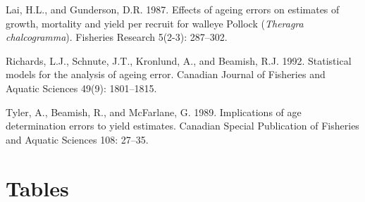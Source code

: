 \documentclass[11pt]{book}
\begin{document}
\leavevmode\hypertarget{ref-lai1987effects}{}%
Lai, H.L., and Gunderson, D.R. 1987. Effects of ageing errors on estimates of growth, mortality and yield per recruit for walleye Pollock (\emph{Theragra chalcogramma}). Fisheries Research 5(2-3): 287--302.

\leavevmode\hypertarget{ref-richards1992statistical}{}%
Richards, L.J., Schnute, J.T., Kronlund, A., and Beamish, R.J. 1992. Statistical models for the analysis of ageing error. Canadian Journal of Fisheries and Aquatic Sciences 49(9): 1801--1815.

\leavevmode\hypertarget{ref-tyler1989implications}{}%
Tyler, A., Beamish, R., and McFarlane, G. 1989. Implications of age determination errors to yield estimates. Canadian Special Publication of Fisheries and Aquatic Sciences 108: 27--35.

\newpage
\setcounter{table}{0}

\hypertarget{tables}{%
\section{Tables}\label{tables}}

\newpage
\end{document}
